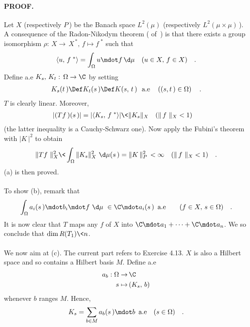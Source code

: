 \paragraph{PROOF.} Let $X$ (respectively $P\,$) be the Banach space $L^2(\mu)$ (respectively $L^2(\mu\times \mu)\,$). A consequence of the Radon-Nikodym theorem ( of \cite{Big_Rudin}\,) is that there exists a group isomorphism $\rho:\, X\to \, X^{\,\ast},\, f\mapsto f^{\,\,\ast}$ such that
\begin{align}
\langle u ,\, f^{\,\,\ast}  \rangle =\int_\Omega u\mdot f \, \d\mu  \quad (u\in X,\, f\in X)\quad .
\end{align}
Define a.e $K_s,\, K_t:\, \Omega\to \C$ by setting
\begin{align}
K_s(t\,)\Def K_t(s\,)\Def  K(s,\, t\,)\, \, \text{ a.e}\quad \left((s,t\,)\in \Omega\right)\quad .
\end{align}
$T$ is clearly linear. Moreover, 
\begin{align}
\lvert (T f\,)(s\,) \rvert = \lvert \langle K_s,\, f^{\,\,\ast} \rangle \rvert \< \| K_s\|_X\quad(\|\,f\,\,\|_X < 1) \quad
\end{align}
(the latter inequality is a Cauchy-Schwarz one). Now apply the Fubini's theorem with $\lvert K\,\rvert^2$ to obtain
\begin{align}
\|Tf\,\,\|^2_X \< \int_\Omega \| K_s\|^2_X \, \,\d \mu (s\,)  =\| K\,\|_P^2 \,< \infty \quad(\|\,f\,\,\|_X < 1)\quad  .
\end{align}
(a) is then proved. \\
\\
To show (b), remark that
\begin{align}
\int_\Omega a_i (s\,) \mdot b_i \mdot f  \,\,\d\mu \,\,\in \C\mdot  a_i(s\,)\,\,\,\text{a.e}\quad \quad (f\in X, \, s\in \Omega)  \quad.
\end{align}
It is now clear that $T$ maps any $f$ of $X$ into $\C \mdot a_1+\dotsb+ \C\mdot a_n$. We so conclude that $\dim R(T_1)\< n $. \\
\\
We now aim at (c). The current part refers to Exercise 4.13. $X$ is also a Hilbert space and so contains a Hilbert basis $M$. Define a.e
\begin{align}
a_b: \Omega \to &\,\C   \\
 s \mapsto &\,(K_s,\, b) \nonumber
\end{align}
whenever $b$ ranges $M$. Hence,
\begin{align}
K_s= \sum_{b\in M} a_b(s\,) \mdot b \, \text{ a.e} \quad (s\in \Omega) \quad.
\end{align}
